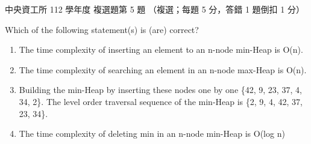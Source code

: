 \begin{pastexam}[label={px:ncu-112-dsa-05}]{中央資工所 112 學年度 複選題第 5 題}
（複選；每題 5 分，答錯 1 題倒扣 1 分）

Which of the following statement(s) is (are) correct?
\begin{enumerate}[label=(\Alph*)]
\item The time complexity of inserting an element to an n-node min-Heap is O(n).
\item The time complexity of searching an element in an n-node max-Heap is O(n).
\item Building the min-Heap by inserting these nodes one by one \{42, 9, 23, 37, 4, 34, 2\}. The level
order traversal sequence of the min-Heap is \{2, 9, 4, 42, 37, 23, 34\}.
\item The time complexity of deleting min in an n-node min-Heap is O(log n)
\end{enumerate}
\end{pastexam}

